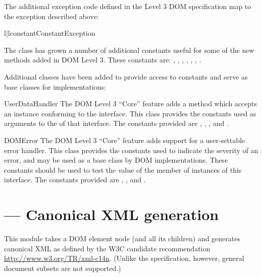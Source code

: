 \documentclass{howto}
\begin{document}
The additional exception code defined in the Level 3 DOM specification
map to the exception described above:

\begin{tableii}{l|l}{constant}{Constant}{Exception}
\end{tableii}

The  class has grown a number of additional constants
useful for some of the new methods added in DOM Level 3.  These
constants are:  ,
, ,
,
,
,
.

Additional classes have been added to provide access to constants and
serve as base classes for implementations:

\begin{classdesc*}{UserDataHandler}
  The DOM Level 3 ``Core'' feature adds a method
   which accepts an instance conforming to the
   interface.  This class provides the
  constants used as arguments to the  of that
  interface.  The constants provided are ,
  , , and
  .
\end{classdesc*}

\begin{classdesc*}{DOMError}
  The DOM Level 3 ``Core'' feature adds support for a user-settable
  error handler.  This class provides the constants used to indicate
  the severity of an error, and may be used as a base class by DOM
  implementations.  These constants should be used to test the value
  of the  member of instances of this interface.  The
  constants provided are ,
  , and .
\end{classdesc*}


\section{ ---
         Canonical XML generation}

This module takes a DOM element node (and all its children) and generates
canonical XML as defined by the W3C candidate recommendation
\url{http://www.w3.org/TR/xml-c14n}.
(Unlike the specification, however, general document subsets are not
supported.)
\end{document}
